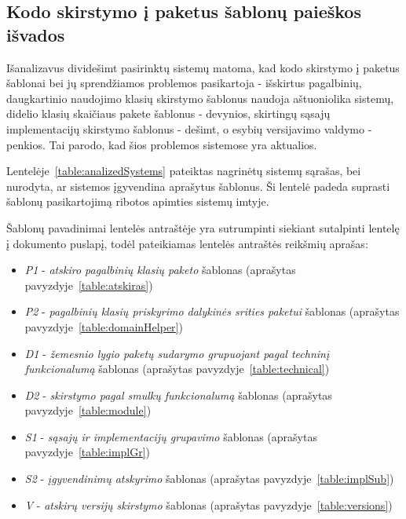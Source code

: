 \subsection{Kodo skirstymo į paketus šablonų paieškos išvados}
Išanalizavus dividešimt pasirinktų sistemų matoma, kad kodo skirstymo į paketus šablonai bei jų sprendžiamos problemos
pasikartoja - išskirtus pagalbinių, daugkartinio naudojimo klasių skirstymo šablonus naudoja aštuoniolika sistemų,
didelio klasių skaičiaus pakete šablonus - devynios, skirtingų sąsajų implementacijų skirstymo šablonus - dešimt,
o esybių versijavimo valdymo - penkios.
Tai parodo, kad šios problemos sistemose yra aktualios.

Lentelėje~\ref{table:analizedSystems} pateiktas nagrinėtų sistemų sąrašas, bei nurodyta, ar sistemos įgyvendina aprašytus šablonus.
Ši lentelė padeda suprasti šablonų pasikartojimą ribotos apimties sistemų imtyje.

Šablonų pavadinimai lentelės antraštėje yra sutrumpinti siekiant sutalpinti lentelę į dokumento puslapį, todėl pateikiamas lentelės antraštės reikšmių aprašas:
\begin{itemize}
    \item \textit{P1} - \textit{atskiro pagalbinių klasių paketo} šablonas (aprašytas pavyzdyje~\ref{table:atskiras})
    \item \textit{P2} - \textit{pagalbinių klasių priskyrimo dalykinės srities paketui} šablonas (aprašytas pavyzdyje~\ref{table:domainHelper})
    \item \textit{D1} - \textit{žemesnio lygio paketų sudarymo grupuojant pagal techninį funkcionalumą} šablonas (aprašytas pavyzdyje~\ref{table:technical})
    \item \textit{D2} - \textit{skirstymo pagal smulkų funkcionalumą} šablonas (aprašytas pavyzdyje~\ref{table:module})
    \item \textit{S1} - \textit{sąsajų ir implementacijų grupavimo} šablonas (aprašytas pavyzdyje~\ref{table:implGr})
    \item \textit{S2} - \textit{įgyvendinimų atskyrimo} šablonas (aprašytas pavyzdyje~\ref{table:implSub})
    \item \textit{V} - \textit{atskirų versijų skirstymo} šablonas (aprašytas pavyzdyje~\ref{table:versions})
\end{itemize}

